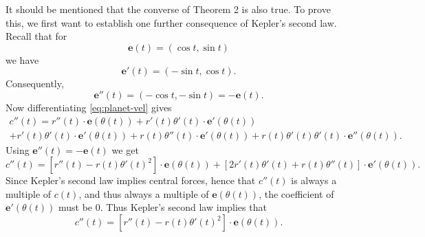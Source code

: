 \documentclass{article}
\numberwithin{corollary}{subsection}
\numberwithin{definition}{subsection}
\numberwithin{lemma}{subsection}
\numberwithin{theorem}{subsection}
\begin{document}
It should be mentioned that the converse of Theorem 2 is also true. To prove
this, we first want to establish one further consequence of Kepler's second
law. Recall that for \[
  \mathbf{e}(t) = (\cos t, \sin t)
\] we have \[
  \mathbf{e}'(t) = (-\sin t, \cos t).
\] Consequently, \[
  \mathbf{e}''(t) = (-\cos t, -\sin t) = -\mathbf{e}(t).
\] Now differentiating \eqref{eq:planet-vel} gives
\begin{multline*}
  c''(t)
  = r''(t) \cdot \mathbf{e}(\theta(t))
  + r'(t)\theta'(t) \cdot \mathbf{e}'(\theta(t)) \\
  + r'(t)\theta'(t) \cdot \mathbf{e}'(\theta(t))
  + r(t)\theta''(t) \cdot \mathbf{e}'(\theta(t))
  + r(t)\theta'(t)\theta'(t) \cdot \mathbf{e}''(\theta(t)).
\end{multline*}
Using $\mathbf{e}''(t) = -\mathbf{e}(t)$ we get \[
  c''(t)
  = [r''(t) - r(t)\theta'(t)^2] \cdot \mathbf{e}(\theta(t))
  + [2r'(t)\theta'(t) + r(t)\theta''(t)] \cdot \mathbf{e}'(\theta(t)).
\] Since Kepler's second law implies central forces, hence that $c''(t)$ is
always a multiple of $c(t)$, and thus always a multiple of
$\mathbf{e}(\theta(t))$, the coefficient of $\mathbf{e}'(\theta(t))$ must be 0.
Thus Kepler's second law implies that
\begin{equation} \label{eq:planet-acc}
  c''(t) = [r''(t) - r(t)\theta'(t)^2] \cdot \mathbf{e}(\theta(t)).
\end{equation}
\end{document}
